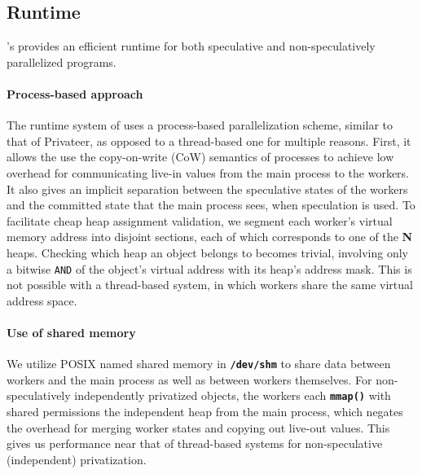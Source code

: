 \subsection{Runtime}

\namensp's provides an efficient runtime
for both speculative and non-speculatively parallelized programs.

\paragraph{Process-based approach}
The runtime system of \name uses a process-based parallelization scheme,
similar to that of Privateer, as opposed to a thread-based one for multiple
reasons. First, it allows the use the copy-on-write (CoW) semantics of
processes to achieve low overhead for communicating live-in values from the
main process to the workers.
It also gives an implicit separation between the speculative states of the
workers and the committed state that the main process sees, when
speculation is used. To facilitate cheap heap assignment validation, we
segment each worker's virtual memory address into disjoint sections, each
of which corresponds to one of the \textbf{N} heaps. Checking which heap an object
belongs to becomes trivial, involving only a bitwise \texttt{AND} of the
object's virtual address with its heap's address mask.
This is not possible
with a thread-based system, in which workers share the same virtual address
space.

\paragraph{Use of shared memory}
We utilize POSIX named shared memory in \texttt{\textbf{/dev/shm}} to share
data between workers and the main process as well as between workers
themselves.
For non-speculatively independently privatized objects, the workers
each \texttt{\textbf{mmap()}} with shared permissions the independent heap
from the main process, which negates the overhead for merging worker states
and copying out live-out values. This gives us performance near that of
thread-based systems for non-speculative (independent) privatization.

